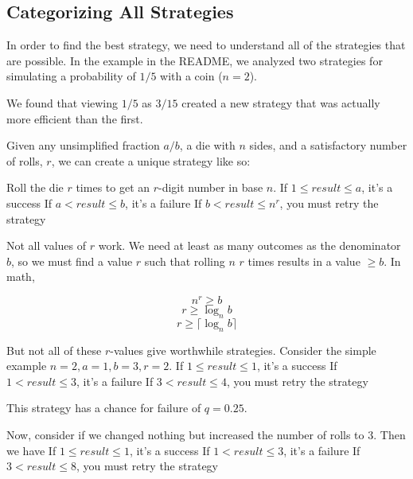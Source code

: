 \documentclass{article}
\begin{document}
\subsection{Categorizing All Strategies}
In order to find the best strategy, we need to understand all of the strategies that are possible.
In the example in the README, we analyzed two strategies for simulating a probability of $1/5$ with a coin ($n=2$).

We found that viewing $1/5$ as $3/15$ created a new strategy that was actually more efficient than the first.

Given any unsimplified fraction $a/b$, a die with $n$ sides, and a satisfactory number of rolls, $r$, we can create a unique strategy like so:\newline

\noindent
Roll the die $r$ times to get an $r$-digit number in base $n$.\newline
If $1\leq result \leq a$, it's a success\newline
If $a<result \leq b$, it's a failure\newline
If $b< result \leq n^r$, you must retry the strategy\newline

Not all values of $r$ work. We need at least as many outcomes as the denominator $b$, so we must find a value $r$ such that rolling $n$ $r$ times results in a value $\geq b$. In math,

$$n^r\geq b$$
$$r\geq \log_n b$$
$$r\geq\lceil\log_n b\rceil$$

But not all of these $r$-values give worthwhile strategies. Consider the simple example $n=2, a=1, b=3, r=2$.\newline
If $1\leq result \leq 1$, it's a success\newline
If $1<result \leq 3$, it's a failure\newline
If $3< result \leq 4$, you must retry the strategy\newline

This strategy has a chance for failure of $q=0.25$.

Now, consider if we changed nothing but increased the number of rolls to $3$. Then we have \newline
If $1\leq result \leq 1$, it's a success\newline
If $1<result \leq 3$, it's a failure\newline
If $3< result \leq 8$, you must retry the strategy\newline
\end{document}
